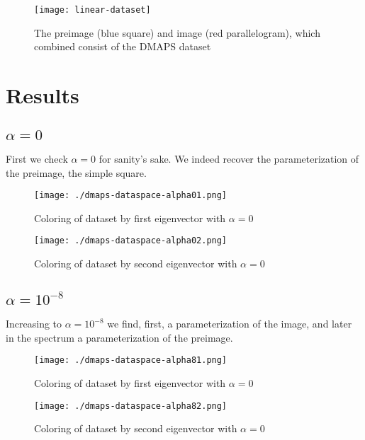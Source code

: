 \documentclass[11pt]{article}
\begin{document}
\begin{figure}[htbp]
  \centering
  \texttt{[image: linear-dataset]}
  \caption{The preimage (blue square) and image (red parallelogram),
    which combined consist of the DMAPS dataset}
\end{figure}

\clearpage

\section{Results}

\subsection{$\alpha=0$}

First we check $\alpha = 0$ for sanity's sake. We indeed recover the
parameterization of the preimage, the simple square.

\begin{figure}[htbp]
  \centering
  \texttt{[image: ./dmaps-dataspace-alpha01.png]}
  \caption{Coloring of dataset by first eigenvector with $\alpha=0$}
\end{figure}

\begin{figure}[htbp]
  \centering
  \texttt{[image: ./dmaps-dataspace-alpha02.png]}
  \caption{Coloring of dataset by second eigenvector with $\alpha=0$}
\end{figure}

\clearpage

\subsection{$\alpha=10^{-8}$}

Increasing to $\alpha = 10^{-8}$ we find, first, a parameterization of
the image, and later in the spectrum a parameterization of the
preimage. 

\begin{figure}[htbp]
  \centering
  \texttt{[image: ./dmaps-dataspace-alpha81.png]}
  \caption{Coloring of dataset by first eigenvector with $\alpha=0$}
\end{figure}

\begin{figure}[htbp]
  \centering
  \texttt{[image: ./dmaps-dataspace-alpha82.png]}
  \caption{Coloring of dataset by second eigenvector with $\alpha=0$}
\end{figure}
\end{document}
